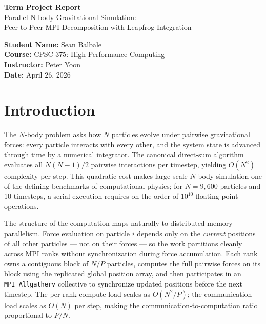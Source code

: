 \documentclass[11pt]{article}
\begin{document}
\begin{titlepage}
  \begin{center}
    \vspace*{1in}
    \Huge
    \textbf{Term Project Report}\\[0.5em]
    \LARGE
    Parallel N-body Gravitational Simulation:\\
    Peer-to-Peer MPI Decomposition with Leapfrog Integration
    \vspace{3in}

    \large
    \textbf{Student Name:} Sean Balbale\\
    \textbf{Course:} CPSC 375: High-Performance Computing\\
    \textbf{Instructor:} Peter Yoon\\
    \textbf{Date:} April 26, 2026
    \vfill
  \end{center}
\end{titlepage}

\newpage

\section{Introduction}

The $N$-body problem asks how $N$ particles evolve under pairwise gravitational forces: every particle interacts with every other, and the system state is advanced through time by a numerical integrator. The canonical direct-sum algorithm evaluates all $N(N-1)/2$ pairwise interactions per timestep, yielding $O(N^2)$ complexity per step. This quadratic cost makes large-scale $N$-body simulation one of the defining benchmarks of computational physics; for $N = 9{,}600$ particles and 10 timesteps, a serial execution requires on the order of $10^{10}$ floating-point operations.

The structure of the computation maps naturally to distributed-memory parallelism. Force evaluation on particle $i$ depends only on the \emph{current} positions of all other particles — not on their forces — so the work partitions cleanly across MPI ranks without synchronization during force accumulation. Each rank owns a contiguous block of $N/P$ particles, computes the full pairwise forces on its block using the replicated global position array, and then participates in an \texttt{MPI\_Allgatherv} collective to synchronize updated positions before the next timestep. The per-rank compute load scales as $O(N^2/P)$; the communication load scales as $O(N)$ per step, making the communication-to-computation ratio proportional to $P/N$.
\end{document}
